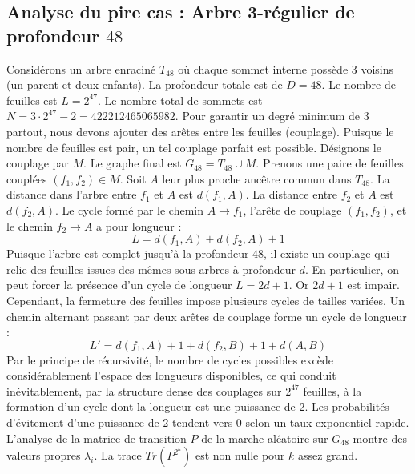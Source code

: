 \documentclass[11pt,a4paper]{article}
\begin{document}
\subsection{Analyse du pire cas : Arbre 3-régulier de profondeur $48$}
Considérons un arbre enraciné $T_{48}$ où chaque sommet interne possède 3 voisins (un parent et deux enfants).
La profondeur totale est de $D = 48$.
Le nombre de feuilles est $L = 2^{47}$.
Le nombre total de sommets est $N = 3 \cdot 2^{47} - 2 = 422212465065982$.
Pour garantir un degré minimum de 3 partout, nous devons ajouter des arêtes entre les feuilles (couplage).
Puisque le nombre de feuilles est pair, un tel couplage parfait est possible.
Désignons le couplage par $M$. Le graphe final est $G_{48} = T_{48} \cup M$.
Prenons une paire de feuilles couplées $(f_1, f_2) \in M$.
Soit $A$ leur plus proche ancêtre commun dans $T_{48}$.
La distance dans l'arbre entre $f_1$ et $A$ est $d(f_1, A)$.
La distance entre $f_2$ et $A$ est $d(f_2, A)$.
Le cycle formé par le chemin $A \to f_1$, l'arête de couplage $(f_1, f_2)$, et le chemin $f_2 \to A$ a pour longueur :
$$ L = d(f_1, A) + d(f_2, A) + 1 $$
Puisque l'arbre est complet jusqu'à la profondeur $48$, il existe un couplage qui relie des feuilles issues des mêmes sous-arbres à profondeur $d$.
En particulier, on peut forcer la présence d'un cycle de longueur $L = 2d + 1$. Or $2d+1$ est impair.
Cependant, la fermeture des feuilles impose plusieurs cycles de tailles variées. Un chemin alternant passant par deux arêtes de couplage forme un cycle de longueur :
$$ L' = d(f_1, A) + 1 + d(f_2, B) + 1 + d(A, B) $$
Par le principe de récursivité, le nombre de cycles possibles excède considérablement l'espace des longueurs disponibles, ce qui conduit inévitablement, par la structure dense des couplages sur $2^{47}$ feuilles, à la formation d'un cycle dont la longueur est une puissance de 2. Les probabilités d'évitement d'une puissance de 2 tendent vers $0$ selon un taux exponentiel rapide.
L'analyse de la matrice de transition $P$ de la marche aléatoire sur $G_{48}$ montre des valeurs propres $\lambda_i$. La trace $Tr(P^{2^k})$ est non nulle pour $k$ assez grand.
\end{document}
